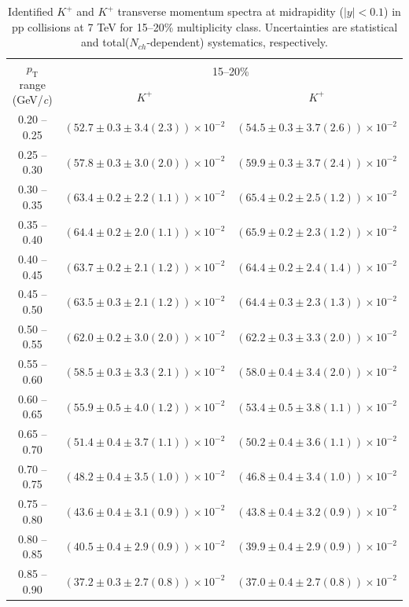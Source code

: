\begin{table}
\caption{Identified $K^{+}$ and $K^{+}$  transverse momentum spectra at midrapidity ($|y|<0.1$) in pp collisions at 7 TeV for 15--20\% multiplicity class. Uncertainties are statistical and total($N_{ch}$-dependent) systematics, respectively.}
\label{tab:KaonPlus_KaonMinus_15to20}
\begin{center}
\begin{tabular}{ c | c c }
\hline
\multirow{2}{*}{$p_{\mathrm{T}}$ range (GeV/\textit{c})} & \multicolumn{2}{c}{15--20\%} \\ & $K^{+}$& $K^{+}$\\ 
\hline
0.20 -- 0.25 & $(52.7\pm0.3\pm3.4(2.3))\times10^{-2}$ & $(54.5\pm0.3\pm3.7(2.6))\times10^{-2}$ \\ 
0.25 -- 0.30 & $(57.8\pm0.3\pm3.0(2.0))\times10^{-2}$ & $(59.9\pm0.3\pm3.7(2.4))\times10^{-2}$ \\ 
0.30 -- 0.35 & $(63.4\pm0.2\pm2.2(1.1))\times10^{-2}$ & $(65.4\pm0.2\pm2.5(1.2))\times10^{-2}$ \\ 
0.35 -- 0.40 & $(64.4\pm0.2\pm2.0(1.1))\times10^{-2}$ & $(65.9\pm0.2\pm2.3(1.2))\times10^{-2}$ \\ 
0.40 -- 0.45 & $(63.7\pm0.2\pm2.1(1.2))\times10^{-2}$ & $(64.4\pm0.2\pm2.4(1.4))\times10^{-2}$ \\ 
0.45 -- 0.50 & $(63.5\pm0.3\pm2.1(1.2))\times10^{-2}$ & $(64.4\pm0.3\pm2.3(1.3))\times10^{-2}$ \\ 
0.50 -- 0.55 & $(62.0\pm0.2\pm3.0(2.0))\times10^{-2}$ & $(62.2\pm0.3\pm3.3(2.0))\times10^{-2}$ \\ 
0.55 -- 0.60 & $(58.5\pm0.3\pm3.3(2.1))\times10^{-2}$ & $(58.0\pm0.4\pm3.4(2.0))\times10^{-2}$ \\ 
0.60 -- 0.65 & $(55.9\pm0.5\pm4.0(1.2))\times10^{-2}$ & $(53.4\pm0.5\pm3.8(1.1))\times10^{-2}$ \\ 
0.65 -- 0.70 & $(51.4\pm0.4\pm3.7(1.1))\times10^{-2}$ & $(50.2\pm0.4\pm3.6(1.1))\times10^{-2}$ \\ 
0.70 -- 0.75 & $(48.2\pm0.4\pm3.5(1.0))\times10^{-2}$ & $(46.8\pm0.4\pm3.4(1.0))\times10^{-2}$ \\ 
0.75 -- 0.80 & $(43.6\pm0.4\pm3.1(0.9))\times10^{-2}$ & $(43.8\pm0.4\pm3.2(0.9))\times10^{-2}$ \\ 
0.80 -- 0.85 & $(40.5\pm0.4\pm2.9(0.9))\times10^{-2}$ & $(39.9\pm0.4\pm2.9(0.9))\times10^{-2}$ \\ 
0.85 -- 0.90 & $(37.2\pm0.3\pm2.7(0.8))\times10^{-2}$ & $(37.0\pm0.4\pm2.7(0.8))\times10^{-2}$ \\ 

\end{tabular}
\end{center}
\end{table}
